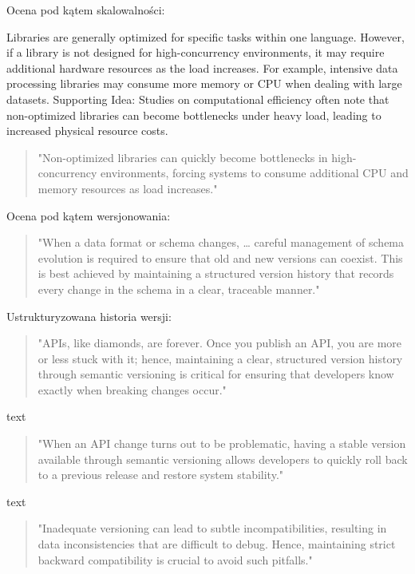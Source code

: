 \documentclass[runningheads,12pt]{llncs}
\begin{document}
Ocena pod kątem skalowalności:

Libraries are generally optimized for specific tasks within one language. However, if a library is not designed for high-concurrency environments, it may require additional hardware resources as the load increases. For example, intensive data processing libraries may consume more memory or CPU when dealing with large datasets. Supporting Idea: Studies on computational efficiency often note that non-optimized libraries can become bottlenecks under heavy load, leading to increased physical resource costs.

\begin{quote}
    "Non-optimized libraries can quickly become bottlenecks in high-concurrency environments, forcing systems to consume additional CPU and memory resources as load increases." ~\cite[p. 192]{fowler2012patterns}
\end{quote}

Ocena pod kątem wersjonowania:

\begin{quote}
    "When a data format or schema changes, … careful management of schema evolution is required to ensure that old and new versions can coexist. This is best achieved by maintaining a structured version history that records every change in the schema in a clear, traceable manner." ~\cite[p. 111]{kleppmann2017designing}
\end{quote}

Ustrukturyzowana historia wersji:

\begin{quote}
    "APIs, like diamonds, are forever. Once you publish an API, you are more or less stuck with it; hence, maintaining a clear, structured version history through semantic versioning is critical for ensuring that developers know exactly when breaking changes occur." ~\cite[p. 75]{Essential}
\end{quote}

text

\begin{quote}
    "When an API change turns out to be problematic, having a stable version available through semantic versioning allows developers to quickly roll back to a previous release and restore system stability." ~\cite[p. 75]{Essential}
\end{quote}

text

\begin{quote}
    "Inadequate versioning can lead to subtle incompatibilities, resulting in data inconsistencies that are difficult to debug. Hence, maintaining strict backward compatibility is crucial to avoid such pitfalls." ~\cite[p. 75]{Essential}
\end{quote}
\end{document}
